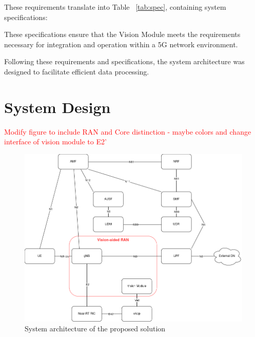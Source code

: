 These requirements translate into Table ~\ref{tab:spec}, containing system specifications:

\begin{table}[H]
\caption{System specifications.}
\label{tab:spec}
\centering
{}
\end{table}

These specifications ensure that the Vision Module meets the requirements necessary for integration and operation within a 5G network environment.


Following these requirements and specifications, the system architecture was designed to facilitate efficient data processing.

\section{System Design}\label{sec:design}

\textcolor{red}{Modify figure to include RAN and Core distinction - maybe colors and change interface of vision module to E2'}
\begin{figure}[H]
    \centering
    \includegraphics[width=0.7\linewidth]{figures/Syst_Arch.drawio}
    \caption[System architecture of the proposed solution]{System architecture of the proposed solution}
    \label{fig:my_arch}
\end{figure}

